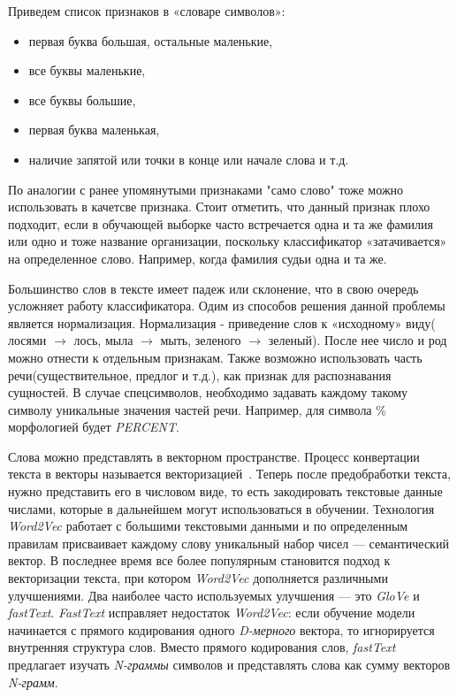 \documentclass{csmathnotes}
\begin{document}
Приведем список признаков в «словаре символов»:
\begin{itemize}
    \item первая буква большая, остальные маленькие,
    \item все буквы маленькие,
    \item все буквы большие,
    \item первая буква маленькая,
    \item наличие запятой или точки в конце или начале слова и т.д.
\end{itemize}


По аналогии с ранее упомянутыми признаками "само слово" тоже можно использовать в качетсве признака. Стоит отметить, что данный признак плохо подходит, если в обучающей выборке часто встречается одна и та же фамилия или одно и тоже название организации, поскольку классификатор «затачивается» на определенное слово. Например, когда фамилия судьи одна и та же.


Большинство слов в тексте имеет падеж или склонение, что в свою очередь усложняет работу классификатора. Одим из способов решения данной проблемы является нормализация. Нормализация - приведение слов к «исходному» виду( лосями $\rightarrow$  лось, мыла $\rightarrow$ мыть, зеленого $\rightarrow$ зеленый). После нее число и род  можно отнести к отдельным признакам. Также возможно использовать часть речи(существительное, предлог и т.д.), как признак для распознавания сущностей. В случае спецсимволов, необходимо задавать каждому такому символу уникальные значения частей речи. Например, для символа \% морфологией будет \emph{PERCENT}.

 
Слова можно представлять в векторном пространстве. Процесс конвертации текста в векторы называется векторизацией~\cite{w2v}. Теперь после предобработки текста, нужно представить его в числовом виде, то есть закодировать текстовые данные числами, которые в дальнейшем могут использоваться в обучении. Технология \emph{Word2Vec} работает с большими текстовыми данными и по определенным правилам присваивает каждому слову уникальный набор чисел — семантический вектор. В последнее время все более популярным становится подход к векторизации текста, при котором \emph{Word2Vec} дополняется различными улучшениями. Два наиболее часто используемых улучшения — это \emph{GloVe} и \emph{fastText}. \emph{FastText} исправляет недостаток \emph{Word2Vec}: если обучение модели начинается с прямого кодирования одного \emph{D-мерного} вектора, то игнорируется внутренняя структура слов. Вместо прямого кодирования слов, \emph{fastText} предлагает изучать \emph{N-граммы} символов и представлять слова как сумму векторов \emph{N-грамм}.
\end{document}
